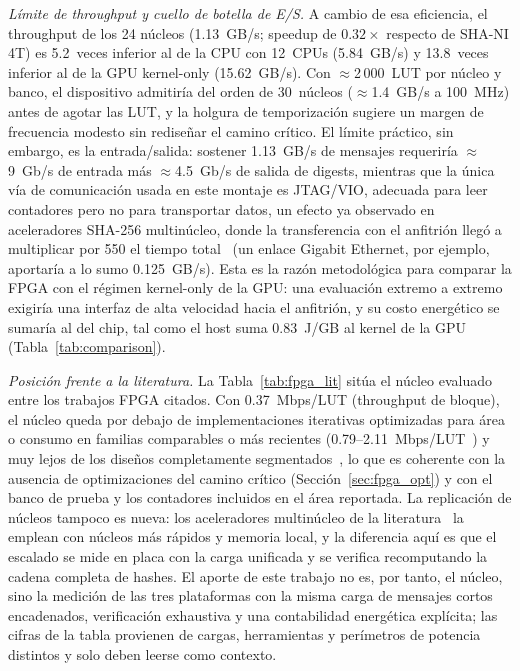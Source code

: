 \documentclass[conference]{IEEEtran}
\begin{document}
\textit{Límite de throughput y cuello de botella de E/S.} A cambio de esa eficiencia, el throughput de los 24 núcleos (1.13~GB/s; speedup de $0.32\times$ respecto de SHA-NI 4T) es 5.2~veces inferior al de la CPU con 12~CPUs (5.84~GB/s) y 13.8~veces inferior al de la GPU kernel-only (15.62~GB/s). Con $\approx$2\,000~LUT por núcleo y banco, el dispositivo admitiría del orden de 30~núcleos ($\approx$1.4~GB/s a 100~MHz) antes de agotar las LUT, y la holgura de temporización sugiere un margen de frecuencia modesto sin rediseñar el camino crítico. El límite práctico, sin embargo, es la entrada/salida: sostener 1.13~GB/s de mensajes requeriría $\approx$9~Gb/s de entrada más $\approx$4.5~Gb/s de salida de digests, mientras que la única vía de comunicación usada en este montaje es JTAG/VIO, adecuada para leer contadores pero no para transportar datos, un efecto ya observado en aceleradores SHA-256 multinúcleo, donde la transferencia con el anfitrión llegó a multiplicar por 550 el tiempo total~\cite{tran2021bca} (un enlace Gigabit Ethernet, por ejemplo, aportaría a lo sumo 0.125~GB/s). Esta es la razón metodológica para comparar la FPGA con el régimen kernel-only de la GPU: una evaluación extremo a extremo exigiría una interfaz de alta velocidad hacia el anfitrión, y su costo energético se sumaría al del chip, tal como el host suma 0.83~J/GB al kernel de la GPU (Tabla~\ref{tab:comparison}).

\textit{Posición frente a la literatura.} La Tabla~\ref{tab:fpga_lit} sitúa el núcleo evaluado entre los trabajos FPGA citados. Con 0.37~Mbps/LUT (throughput de bloque), el núcleo queda por debajo de implementaciones iterativas optimizadas para área o consumo en familias comparables o más recientes (0.79--2.11~Mbps/LUT~\cite{r4, martino_iot2020, gad2020low}) y muy lejos de los diseños completamente segmentados~\cite{r2}, lo que es coherente con la ausencia de optimizaciones del camino crítico (Sección~\ref{sec:fpga_opt}) y con el banco de prueba y los contadores incluidos en el área reportada. La replicación de núcleos tampoco es nueva: los aceleradores multinúcleo de la literatura~\cite{phan2021multicore, tran2021bca} la emplean con núcleos más rápidos y memoria local, y la diferencia aquí es que el escalado se mide en placa con la carga unificada y se verifica recomputando la cadena completa de hashes. El aporte de este trabajo no es, por tanto, el núcleo, sino la medición de las tres plataformas con la misma carga de mensajes cortos encadenados, verificación exhaustiva y una contabilidad energética explícita; las cifras de la tabla provienen de cargas, herramientas y perímetros de potencia distintos y solo deben leerse como contexto.
\end{document}
